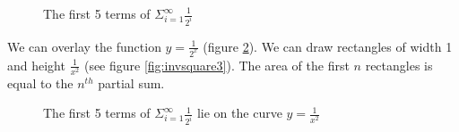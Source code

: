 \begin{figure}[htbp]
    \centering
    \caption{The first 5 terms of $\Sigma_{i = 1}^\infty \frac{1}{2^i}$}
    \label{fig:invsquare1}
\end{figure}

We can overlay the function $y = \frac{1}{2^x}$ (figure \ref{fig:invsquare2}). 
We can draw rectangles of width 1 and height $\frac{1}{x^2}$ (see figure 
\ref{fig:invsquare3}). The area of the first $n$ rectangles is equal to the 
$n^{th}$ partial sum. 

\begin{figure}[htbp]
    \centering
    \caption{The first 5 terms of $\Sigma_{i = 1}^\infty \frac{1}{2^i}$ lie on 
    the curve $y = \frac{1}{x^2}$}
    \label{fig:invsquare2}
\end{figure}

